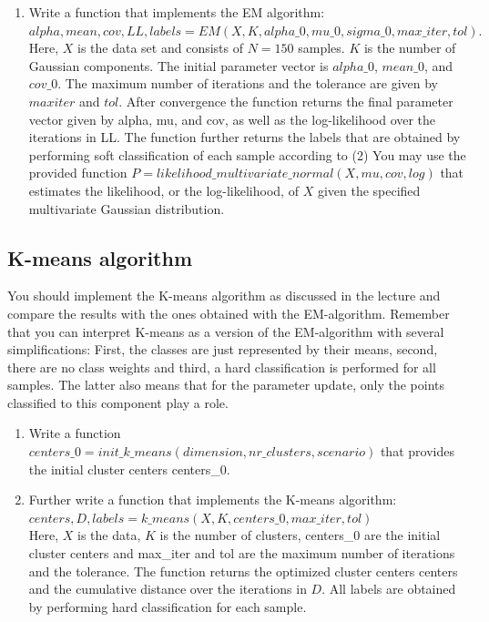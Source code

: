 \documentclass[a4paper]{article}
\begin{document}
\begin{enumerate}
\item Write a function that implements the EM algorithm: \\
$alpha, mean, cov, LL, labels = EM(X, K, alpha\_0, mu\_0, sigma\_0, max\_iter, tol).$\\
Here, $X$ is the data set and consists of $N = 150$ samples. $K$ is the number of Gaussian components. The initial parameter vector is $alpha\_0$, $mean\_0$, and $cov\_0$. The maximum number of iterations and the tolerance are given by $max iter$ and $tol$. After convergence the function returns the final parameter vector given by alpha, mu, and cov, as well as the log-likelihood over the iterations in LL. The function further returns the labels that
are obtained by performing soft classification of each sample according to (2) 
\newline
You may use the provided function $P = likelihood\_multivariate\_normal(X,mu,cov,log)$ that estimates the likelihood, or the log-likelihood, of $X$ given the specified multivariate Gaussian distribution.
\end{enumerate}

\subsection{K-means algorithm}
You should implement the K-means algorithm as discussed in the lecture and compare the results with the ones obtained with the EM-algorithm. Remember that you can interpret K-means as a version of the EM-algorithm with several simplifications: First, the classes are just represented by their means, second, there are no class weights and third, a hard classification is performed for all samples. The latter also means that for the parameter update, only the points classified to this component play a role.
\begin{enumerate}
\item  Write a function $centers\_0 = init\_k\_means(dimension, nr\_clusters, scenario)$ that provides the initial cluster centers centers\_0.
\item Further write a function that implements the K-means algorithm: $centers, D, labels = k\_means(X, K, centers\_0, max\_iter, tol)$\\
Here, $X$ is the data, $K$ is the number of clusters, centers\_0 are the initial cluster centers and max\_iter and tol are the maximum number of iterations and the tolerance. The function returns the optimized cluster centers centers and the cumulative distance over the iterations in $D$. All labels are obtained by performing hard classification for each sample.
\end{enumerate}
\end{document}
